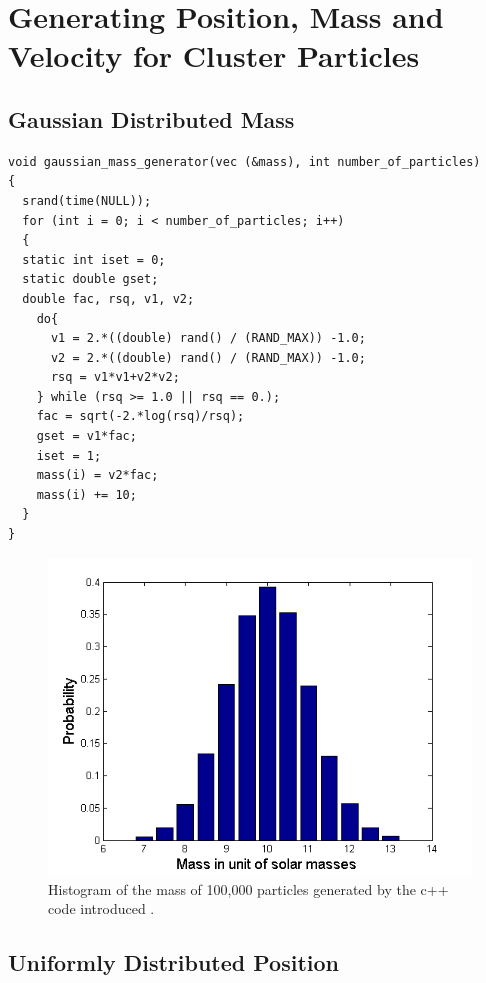 \section{Generating Position, Mass and Velocity for Cluster Particles}
\label{Method:GeneratingPosMassVel}
\subsection{Gaussian Distributed Mass}

\begin{lstlisting}
void gaussian_mass_generator(vec (&mass), int number_of_particles)
{
  srand(time(NULL));
  for (int i = 0; i < number_of_particles; i++)
  {
  static int iset = 0;
  static double gset;
  double fac, rsq, v1, v2;
    do{
      v1 = 2.*((double) rand() / (RAND_MAX)) -1.0;
      v2 = 2.*((double) rand() / (RAND_MAX)) -1.0;
      rsq = v1*v1+v2*v2;
    } while (rsq >= 1.0 || rsq == 0.);
    fac = sqrt(-2.*log(rsq)/rsq);
    gset = v1*fac;
    iset = 1;
    mass(i) = v2*fac;
    mass(i) += 10;
  }
}
\end{lstlisting}

\begin{figure}[H]
\centering
	\includegraphics[width=0.7\linewidth]{Figures/random_mass_test.png}
\caption{
Histogram of the mass of 100,000 particles generated by the c++ code introduced . 
}
\label{fig:GaussianGeneratedMass}
\end{figure}


\subsection{Uniformly Distributed Position}

